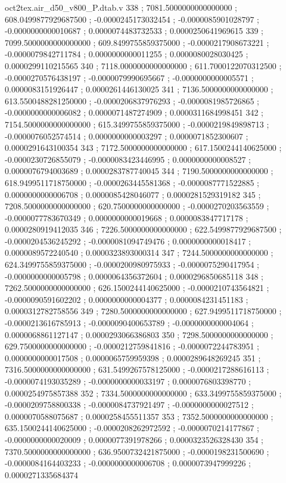 \begin{filecontents}[overwrite]{oct2tex.air_d50_v800_P.dtab.v}
338 ; 7081.5000000000000000 ; 608.0499877929687500 ; -0.0000245173032454 ; -0.0000085901028797 ; -0.0000000000010687 ; 0.0000074483732533 ; 0.0000250641969615
339 ; 7099.5000000000000000 ; 609.8499755859375000 ; -0.0000217908673221 ; -0.0000079842711784 ; 0.0000000000011255 ; 0.0000080028030425 ; 0.0000299110215565
340 ; 7118.0000000000000000 ; 611.7000122070312500 ; -0.0000270576438197 ; -0.0000079990695667 ; -0.0000000000005571 ; 0.0000083151926447 ; 0.0000261446130025
341 ; 7136.5000000000000000 ; 613.5500488281250000 ; -0.0000206837976293 ; -0.0000081985726865 ; -0.0000000000006082 ; 0.0000071487274909 ; 0.0000311684998451
342 ; 7154.5000000000000000 ; 615.3499755859375000 ; -0.0000219849898713 ; -0.0000076052574514 ; 0.0000000000003297 ; 0.0000071852300607 ; 0.0000291643100354
343 ; 7172.5000000000000000 ; 617.1500244140625000 ; -0.0000230726855079 ; -0.0000083423446995 ; 0.0000000000008527 ; 0.0000076794003689 ; 0.0000283787740045
344 ; 7190.5000000000000000 ; 618.9499511718750000 ; -0.0000263445581368 ; -0.0000087771522885 ; 0.0000000000006708 ; 0.0000085428046077 ; 0.0000281529319182
345 ; 7208.5000000000000000 ; 620.7500000000000000 ; -0.0000270203563559 ; -0.0000077783670349 ; 0.0000000000019668 ; 0.0000083847717178 ; 0.0000280919412035
346 ; 7226.5000000000000000 ; 622.5499877929687500 ; -0.0000204536245292 ; -0.0000081094749476 ; 0.0000000000018417 ; 0.0000089572240540 ; 0.0000323893000314
347 ; 7244.5000000000000000 ; 624.3499755859375000 ; -0.0000200980975933 ; -0.0000075290417954 ; -0.0000000000005798 ; 0.0000064356372604 ; 0.0000296850685118
348 ; 7262.5000000000000000 ; 626.1500244140625000 ; -0.0000210743564821 ; -0.0000090591602202 ; 0.0000000000004377 ; 0.0000084231451183 ; 0.0000312782758556
349 ; 7280.5000000000000000 ; 627.9499511718750000 ; -0.0000213616785913 ; -0.0000090400653789 ; -0.0000000000004064 ; 0.0000068861127147 ; 0.0000293066386803
350 ; 7298.5000000000000000 ; 629.7500000000000000 ; -0.0000212759841816 ; -0.0000072244783951 ; 0.0000000000017508 ; 0.0000065759959398 ; 0.0000289648269245
351 ; 7316.5000000000000000 ; 631.5499267578125000 ; -0.0000217288616113 ; -0.0000074193035289 ; -0.0000000000033197 ; 0.0000076803398770 ; 0.0000254975857388
352 ; 7334.5000000000000000 ; 633.3499755859375000 ; -0.0000209758800338 ; -0.0000084737921497 ; -0.0000000000027512 ; 0.0000070588075687 ; 0.0000258455511357
353 ; 7352.5000000000000000 ; 635.1500244140625000 ; -0.0000208262972592 ; -0.0000070214177867 ; -0.0000000000020009 ; 0.0000077391978266 ; 0.0000323526328430
354 ; 7370.5000000000000000 ; 636.9500732421875000 ; -0.0000198231500690 ; -0.0000084164403233 ; -0.0000000000006708 ; 0.0000073947999226 ; 0.0000271335684374

\end{filecontents}

